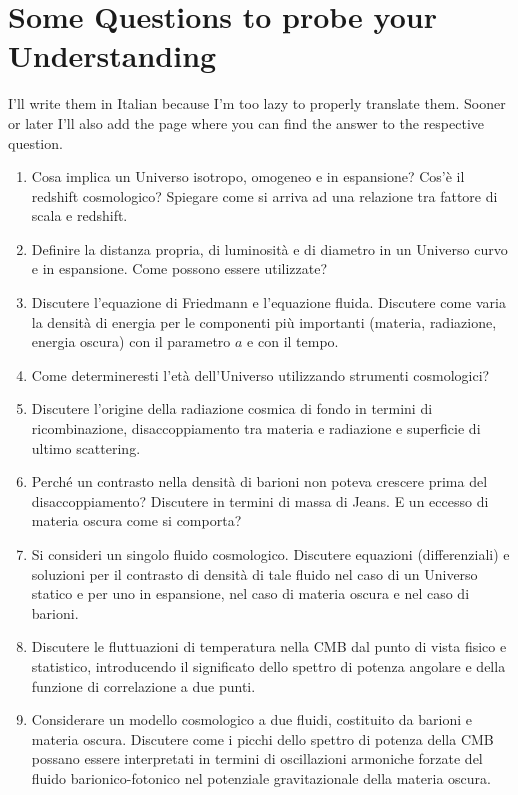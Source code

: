 \newpage
\section*{Some Questions to probe your Understanding}

I'll write them in Italian because I'm too lazy to properly translate them. Sooner or later I'll also add the page where you can find the answer to the respective question.

\begin{enumerate}
    \item Cosa implica un Universo isotropo, omogeneo e in espansione? Cos’è il redshift cosmologico? Spiegare come si arriva ad una relazione tra fattore di scala e redshift.
    \item Definire la distanza propria, di luminosità e di diametro in un Universo curvo e in espansione. Come possono essere utilizzate?
    \item Discutere l’equazione di Friedmann e l’equazione fluida. Discutere come varia la densità di energia per le componenti più importanti (materia, radiazione, energia oscura) con il parametro $a$ e con il tempo.
    \item Come determineresti l’età dell’Universo utilizzando strumenti cosmologici?
    \item Discutere l’origine della radiazione cosmica di fondo in termini di ricombinazione, disaccoppiamento tra materia e radiazione e superficie di ultimo scattering.
    \item Perché un contrasto nella densità di barioni non poteva crescere prima del disaccoppiamento? Discutere in termini di massa di Jeans. E un eccesso di materia oscura come si comporta?
    \item Si consideri un singolo fluido cosmologico. Discutere equazioni (differenziali) e soluzioni per il contrasto di densità di tale fluido nel caso di un Universo statico e per uno in espansione, nel caso di materia oscura e nel caso di barioni.
    \item Discutere le fluttuazioni di temperatura nella CMB dal punto di vista fisico e statistico, introducendo il significato dello spettro di potenza angolare e della funzione di correlazione a due punti.
    \item Considerare un modello cosmologico a due fluidi, costituito da barioni e materia oscura. Discutere come i picchi dello spettro di potenza della CMB possano essere interpretati in termini di oscillazioni armoniche forzate del fluido barionico-fotonico nel potenziale gravitazionale della materia oscura.

\end{enumerate}
